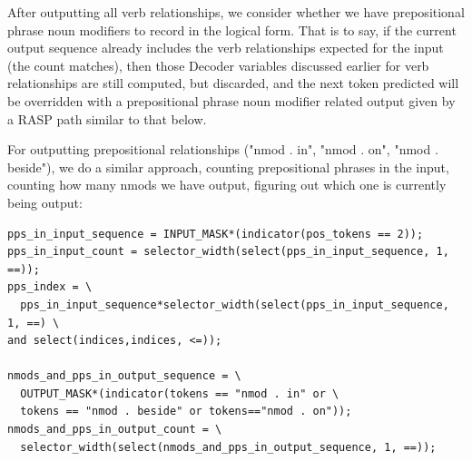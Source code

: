 \documentclass[11pt]{article}
\begin{document}
\clearpage
After outputting all verb relationships, we consider whether we have prepositional phrase noun modifiers to record in the logical form.
That is to say, if the current output sequence already includes the verb relationships expected for the input (the count matches), 
then those Decoder variables discussed earlier for verb relationships are still computed, but discarded,
and the next token predicted will be overridden with a prepositional phrase noun modifier related output given by a RASP path similar to that below.

For outputting prepositional relationships ("nmod . in", "nmod . on", "nmod . beside"), we do a similar approach, counting prepositional phrases in the input, counting how many nmods we have output, figuring out which one is currently being output:

\begin{tiny}
\begin{verbatim}
pps_in_input_sequence = INPUT_MASK*(indicator(pos_tokens == 2));
pps_in_input_count = selector_width(select(pps_in_input_sequence, 1, ==));
pps_index = \
  pps_in_input_sequence*selector_width(select(pps_in_input_sequence, 1, ==) \
and select(indices,indices, <=));

nmods_and_pps_in_output_sequence = \
  OUTPUT_MASK*(indicator(tokens == "nmod . in" or \
  tokens == "nmod . beside" or tokens=="nmod . on"));
nmods_and_pps_in_output_count = \
  selector_width(select(nmods_and_pps_in_output_sequence, 1, ==));
\end{verbatim}
\end{tiny}
\end{document}
